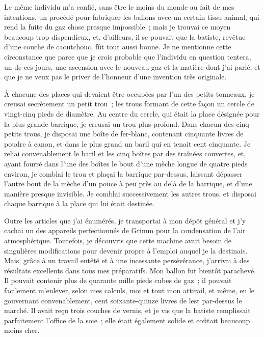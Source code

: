 \documentclass[french,twoside]{book} %
\begin{document}
Le même individu m’a confié, sans être le moins du monde au fait de mes intentions, un procédé pour fabriquer les ballons avec un certain tissu animal, qui rend la fuite du gaz chose presque impossible ; mais je trouvai ce moyen beaucoup trop dispendieux, et, d’ailleurs, il se pouvait que la batiste, revêtue d’une couche de caoutchouc, fût tout aussi bonne. Je ne mentionne cette circonstance que parce que je crois probable que l’individu en question tentera, un de ces jours, une ascension avec le nouveau gaz et la matière dont j’ai parlé, et que je ne veux pas le priver de l’honneur d’une invention très originale.\par
À chacune des places qui devaient être occupées par l’un des petits tonneaux, je creusai secrètement un petit trou ; les trous formant de cette façon un cercle de vingt-cinq pieds de diamètre. Au centre du cercle, qui était la place désignée pour la plus grande barrique, je creusai un trou plus profond. Dans chacun des cinq petits trous, je disposai une boîte de fer-blanc, contenant cinquante livres de poudre à canon, et dans le plus grand un baril qui en tenait cent cinquante. Je reliai convenablement le baril et les cinq boîtes par des traînées couvertes, et, ayant fourré dans l’une des boîtes le bout d’une mèche longue de quatre pieds environ, je comblai le trou et plaçai la barrique par-dessus, laissant dépasser l’autre bout de la mèche d’un pouce à peu près au delà de la barrique, et d’une manière presque invisible. Je comblai successivement les autres trous, et disposai chaque barrique à la place qui lui était destinée.\par
Outre les articles que j’ai énumérés, je transportai à mon dépôt général et j’y cachai un des appareils perfectionnés de Grimm pour la condensation de l’air atmosphérique. Toutefois, je découvris que cette machine avait besoin de singulières modifications pour devenir propre à l’emploi auquel je la destinais. Mais, grâce à un travail entêté et à une incessante persévérance, j’arrivai à des résultats excellents dans tous mes préparatifs. Mon ballon fut bientôt parachevé. Il pouvait contenir plus de quarante mille pieds cubes de gaz ; il pouvait facilement m’enlever, selon mes calculs, moi et tout mon attirail, et même, en le gouvernant convenablement, cent soixante-quinze livres de lest par-dessus le marché. Il avait reçu trois couches de vernis, et je vis que la batiste remplissait parfaitement l’office de la soie ; elle était également solide et coûtait beaucoup moins cher.\par
\end{document}

